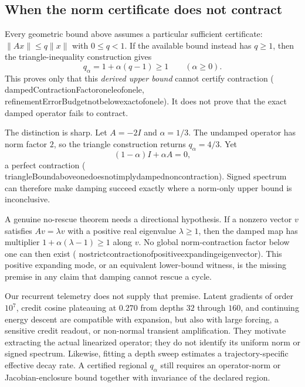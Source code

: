 \documentclass[11pt]{article}
\newcommand{\leanname}[1]{{\scriptsize\ttfamily
  \def\_{\textunderscore\allowbreak}#1}}
\begin{document}
\subsection{When the norm certificate does not contract}
\label{sec:expanding-cycle}

Every geometric bound above assumes a particular sufficient certificate:
$\|Ax\|\le q\|x\|$ with $0\le q<1$.  If the available bound instead has $q\ge1$, then
the triangle-inequality construction gives
\[
  q_\alpha=1+\alpha(q-1)\ge1
  \qquad(\alpha\ge0).
\]
This proves only that this \emph{derived upper bound} cannot certify contraction
(\leanname{dampedContractionFactor\_one\_le\_of\_one\_le},
\leanname{refinementErrorBudget\_not\_below\_exact\_of\_one\_le}).  It does not prove
that the exact damped operator fails to contract.

The distinction is sharp.  Let $A=-2I$ and $\alpha=1/3$.  The undamped operator has
norm factor $2$, so the triangle construction returns $q_\alpha=4/3$.  Yet
\[
  (1-\alpha)I+\alpha A=0,
\]
a perfect contraction
(\leanname{triangleBound\_above\_one\_does\_not\_imply\_damped\_noncontraction}).
Signed spectrum can therefore make damping succeed exactly where a norm-only upper bound
is inconclusive.

A genuine no-rescue theorem needs a directional hypothesis.  If a nonzero vector $v$
satisfies $Av=\lambda v$ with a positive real eigenvalue $\lambda\ge1$, then the damped
map has multiplier $1+\alpha(\lambda-1)\ge1$ along $v$.  No global norm-contraction
factor below one can then exist
(\leanname{no\_strict\_contraction\_of\_positive\_expanding\_eigenvector}).  This
positive expanding mode, or an equivalent lower-bound witness, is the missing premise in
any claim that damping cannot rescue a cycle.

Our recurrent telemetry does not supply that premise.  Latent gradients of order
$10^7$, credit cosine plateauing at $0.270$ from depths $32$ through $160$, and continuing
energy descent are compatible with expansion, but also with large forcing, a sensitive
credit readout, or non-normal transient amplification.  They motivate extracting the
actual linearized operator; they do not identify its uniform norm or signed spectrum.
Likewise, fitting a depth sweep estimates a trajectory-specific effective decay rate.  A
certified regional $q_\alpha$ still requires an operator-norm or Jacobian-enclosure bound
together with invariance of the declared region.
\end{document}
